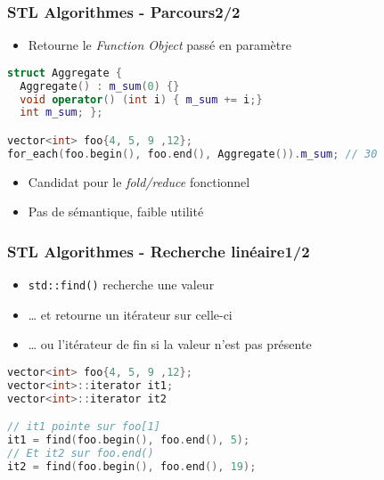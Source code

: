 \documentclass[C++.tex]{subfiles}
\begin{document}
\begin{frame}[fragile]
	\frametitle{STL Algorithmes - Parcours\titlehfill{}2/2}
	\begin{itemize}
		\item Retourne le \textit{Function Object} passé en paramètre
	\end{itemize}

	\begin{lstlisting}[language=C++]
struct Aggregate {
  Aggregate() : m_sum(0) {}
  void operator() (int i) { m_sum += i;}
  int m_sum; };

vector<int> foo{4, 5, 9 ,12};
for_each(foo.begin(), foo.end(), Aggregate()).m_sum; // 30\end{lstlisting}

	\begin{itemize}
		\item Candidat pour le \textit{fold/reduce} fonctionnel
		\item Pas de sémantique, faible utilité

	\end{itemize}
\end{frame}

\begin{frame}[fragile]
	\frametitle{STL Algorithmes - Recherche linéaire\titlehfill{}1/2}
	\begin{itemize}
		\item \lstinline|std::find()| recherche une valeur
		\item \ldots{} et retourne un itérateur sur celle-ci
		\item \ldots{} ou l'itérateur de fin si la valeur n'est pas présente
	\end{itemize}

	\begin{lstlisting}[language=C++]
vector<int> foo{4, 5, 9 ,12};
vector<int>::iterator it1;
vector<int>::iterator it2

// it1 pointe sur foo[1]
it1 = find(foo.begin(), foo.end(), 5);
// Et it2 sur foo.end()
it2 = find(foo.begin(), foo.end(), 19);\end{lstlisting}
\end{frame}
\end{document}
